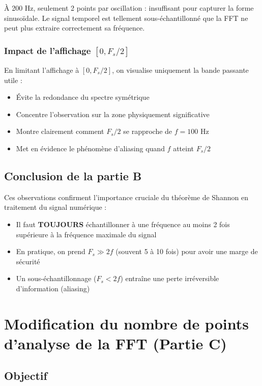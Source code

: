 \documentclass[12pt,a4paper]{article}
\begin{document}
À 200 Hz, seulement 2 points par oscillation : insuffisant pour capturer la forme sinusoïdale. Le signal temporel est tellement sous-échantillonné que la FFT ne peut plus extraire correctement sa fréquence.

\subsubsection{Impact de l'affichage $[0, F_s/2]$}

En limitant l'affichage à $[0, F_s/2]$, on visualise uniquement la bande passante utile :

\begin{itemize}
    \item Évite la redondance du spectre symétrique
    \item Concentre l'observation sur la zone physiquement significative
    \item Montre clairement comment $F_s/2$ se rapproche de $f = 100$ Hz
    \item Met en évidence le phénomène d'aliasing quand $f$ atteint $F_s/2$
\end{itemize}

\subsection{Conclusion de la partie B}

Ces observations confirment l'importance cruciale du théorème de Shannon en traitement du signal numérique :

\begin{itemize}
    \item Il faut \textbf{TOUJOURS} échantillonner à une fréquence au moins 2 fois supérieure à la fréquence maximale du signal
    \item En pratique, on prend $F_s \gg 2f$ (souvent 5 à 10 fois) pour avoir une marge de sécurité
    \item Un sous-échantillonnage ($F_s < 2f$) entraîne une perte irréversible d'information (aliasing)
\end{itemize}

\newpage

\section{Modification du nombre de points d'analyse de la FFT (Partie C)}

\subsection{Objectif}
\end{document}
